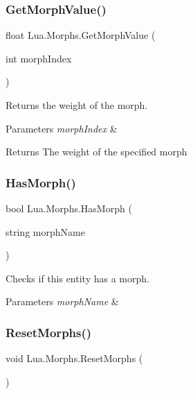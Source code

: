 \subsubsection{\texorpdfstring{GetMorphValue()}{GetMorphValue()}\hspace{0.1cm}{\footnotesize\ttfamily [2/2]}}
{\footnotesize\ttfamily float Lua.\+Morphs.\+Get\+Morph\+Value (\begin{DoxyParamCaption}\item[{int}]{morph\+Index }\end{DoxyParamCaption})}



Returns the weight of the morph. 


\begin{DoxyParams}{Parameters}
{\em morph\+Index} & \\
\hline
\end{DoxyParams}
\begin{DoxyReturn}{Returns}
The weight of the specified morph
\end{DoxyReturn}
\mbox{\label{class_lua_1_1_morphs_a223235569f3712c33c6975f26ec83549}} 
\subsubsection{\texorpdfstring{HasMorph()}{HasMorph()}}
{\footnotesize\ttfamily bool Lua.\+Morphs.\+Has\+Morph (\begin{DoxyParamCaption}\item[{string}]{morph\+Name }\end{DoxyParamCaption})}



Checks if this entity has a morph. 


\begin{DoxyParams}{Parameters}
{\em morph\+Name} & \\
\hline
\end{DoxyParams}
\mbox{\label{class_lua_1_1_morphs_a1fc28aa3c4e3aa18fd044f2420d9a32b}} 
\subsubsection{\texorpdfstring{ResetMorphs()}{ResetMorphs()}}
{\footnotesize\ttfamily void Lua.\+Morphs.\+Reset\+Morphs (\begin{DoxyParamCaption}{ }\end{DoxyParamCaption})}



